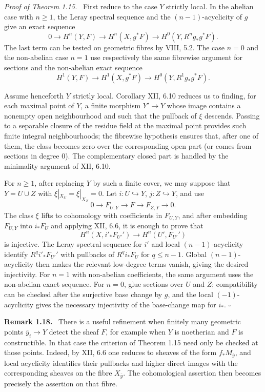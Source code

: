 \documentclass[12pt]{article}
\newcommand{\qedtext}{\hfill\(\square\)}
\newenvironment{remarktext}[1]{\par\medskip\noindent\textbf{#1.}\ }{\par\medskip}
\newenvironment{prooftext}[1][Proof]{\par\noindent\emph{#1.}\ }{\par\medskip}
\begin{document}
\begin{prooftext}[Proof of Theorem 1.15]
First reduce to the case \(Y\) strictly local. In the abelian case with \(n\ge1\), the Leray spectral sequence and the \((n-1)\)-acyclicity of \(g\) give an exact sequence
\[
0\to H^n(Y,F)\to H^n(X,g^*F)\to H^0(Y,R^ng_*g^*F).
\]
The last term can be tested on geometric fibres by VIII, 5.2. The case \(n=0\) and the non-abelian case \(n=1\) use respectively the same fibrewise argument for sections and the non-abelian exact sequence
\[
H^1(Y,F)\to H^1(X,g^*F)\to H^0(Y,R^1g_*g^*F).
\]

Assume henceforth \(Y\) strictly local. Corollary XII, 6.10 reduces us to finding, for each maximal point of \(Y\), a finite morphism \(Y'\to Y\) whose image contains a nonempty open neighbourhood and such that the pullback of \(\xi\) descends. Passing to a separable closure of the residue field at the maximal point provides such finite integral neighbourhoods; the fibrewise hypothesis ensures that, after one of them, the class becomes zero over the corresponding open part (or comes from sections in degree \(0\)). The complementary closed part is handled by the minimality argument of XII, 6.10.

For \(n\ge1\), after replacing \(Y\) by such a finite cover, we may suppose that \(Y=U\cup Z\) with \(\xi|_{X_U}=\xi|_{X_Z}=0\). Let \(i:U\hookrightarrow Y\), \(j:Z\hookrightarrow Y\), and use
\[
0\to F_{U,Y}\to F\to F_{Z,Y}\to0.
\]
The class \(\xi\) lifts to cohomology with coefficients in \(F_{U,Y}\), and after embedding \(F_{U,Y}\) into \(i_*F_U\) and applying XII, 6.6, it is enough to prove that
\[
H^n(X,i'_*F_{U'}')\to H^n(U',F_{U'}')
\]
is injective. The Leray spectral sequence for \(i'\) and local \((n-1)\)-acyclicity identify \(R^qi'_*F_{U'}'\) with pullbacks of \(R^qi_*F_U\) for \(q\le n-1\). Global \((n-1)\)-acyclicity then makes the relevant low-degree terms vanish, giving the desired injectivity. For \(n=1\) with non-abelian coefficients, the same argument uses the non-abelian exact sequence. For \(n=0\), glue sections over \(U\) and \(Z\); compatibility can be checked after the surjective base change by \(g\), and the local \((-1)\)-acyclicity gives the necessary injectivity of the base-change map for \(i_*\). \qedtext
\end{prooftext}

\begin{remarktext}{Remark 1.18}
There is a useful refinement when finitely many geometric points \(\bar y_i\to Y\) detect the sheaf \(F\), for example when \(Y\) is noetherian and \(F\) is constructible. In that case the criterion of Theorem 1.15 need only be checked at those points. Indeed, by XII, 6.6 one reduces to sheaves of the form \(f_*M_{\bar y}\), and local acyclicity identifies their pullbacks and higher direct images with the corresponding sheaves on the fibre \(X_{\bar y}\). The cohomological assertion then becomes precisely the assertion on that fibre.
\end{remarktext}
\end{document}
